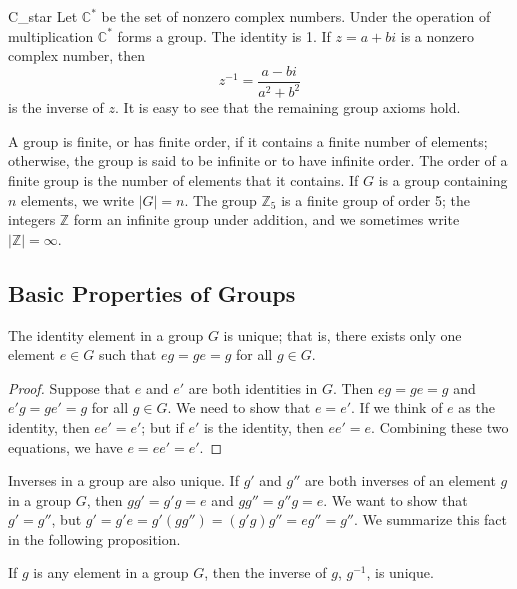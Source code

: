  
\begin{example}{C_star}
Let ${\mathbb C}^\ast$\label{noteCstar} be the set of nonzero complex 
numbers. Under the
operation of multiplication ${\mathbb C}^\ast$ forms a group.  The
identity is 1. If $z = a+bi$ is a nonzero complex number, then
\[
z^{-1} = \frac{a -bi}{a^2 +b^2}
\]
is the inverse of $z$.  It is easy to see that the remaining group
axioms hold. 
\end{example}
 
 

 
 
A group is {\bfi finite}, or has {\bfi finite
order}, if it contains a finite number of elements; otherwise, the
group is said to be {\bfi infinite\/} or to have {\bfi infinite
order}. The {\bfi order\/}
of a finite group is the number of elements that it contains. If $G$
is a group containing $n$ elements, we write $|G| =
n$\label{noteorder}. The group ${\mathbb Z}_5$ is a finite group of order
5; the integers ${\mathbb Z}$ form an infinite group under addition, and
we sometimes write $|{\mathbb Z}| = \infty$.
 
 
\subsection*{Basic Properties of Groups}
 
 
\begin{proposition}
The identity element in a group $G$ is unique; that is, there exists
only one element $e \in G$ such that $eg = ge = g$ for all $g \in G$. 
\end{proposition}
 
 
\begin{proof}
Suppose that $e$ and $e'$ are both identities in $G$. Then $eg = ge =
g$ and $e'g = ge' = g$ for all $g \in G$. We need to show that $e =
e'$. If we think of $e$ as the identity, then $ee' = e'$; but if $e'$
is the identity, then $ee' = e$. Combining these two equations, we
have $e = ee' = e'$. 
\end{proof}
 
 
\medskip
 
 
Inverses in a group are also unique. If $g'$ and $g''$ are both
inverses of an element $g$ in a group $G$, then $gg' = g'g = e$ and
$gg'' = g''g = e$. We want to show that $g' = g''$, but $g' = g'e =
g'(gg'') = (g'g)g'' = eg'' = g''$. We summarize this fact in the
following proposition. 
 
 
\begin{proposition}
If $g$ is any element in a group $G$, then the inverse of $g$,
$g^{-1}$, is unique. 
\end{proposition}
 
